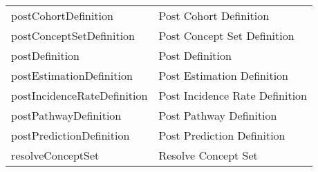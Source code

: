 \documentclass[
]{article}
\begin{document}
\begin{longtable}[]{@{}ll@{}}
\begin{minipage}[t]{0.46\columnwidth}
postCohortDefinition\strut
\end{minipage} & \begin{minipage}[t]{0.48\columnwidth}\raggedright
Post Cohort Definition\strut
\end{minipage}\tabularnewline
\begin{minipage}[t]{0.46\columnwidth}\raggedright
postConceptSetDefinition\strut
\end{minipage} & \begin{minipage}[t]{0.48\columnwidth}\raggedright
Post Concept Set Definition\strut
\end{minipage}\tabularnewline
\begin{minipage}[t]{0.46\columnwidth}\raggedright
postDefinition\strut
\end{minipage} & \begin{minipage}[t]{0.48\columnwidth}\raggedright
Post Definition\strut
\end{minipage}\tabularnewline
\begin{minipage}[t]{0.46\columnwidth}\raggedright
postEstimationDefinition\strut
\end{minipage} & \begin{minipage}[t]{0.48\columnwidth}\raggedright
Post Estimation Definition\strut
\end{minipage}\tabularnewline
\begin{minipage}[t]{0.46\columnwidth}\raggedright
postIncidenceRateDefinition\strut
\end{minipage} & \begin{minipage}[t]{0.48\columnwidth}\raggedright
Post Incidence Rate Definition\strut
\end{minipage}\tabularnewline
\begin{minipage}[t]{0.46\columnwidth}\raggedright
postPathwayDefinition\strut
\end{minipage} & \begin{minipage}[t]{0.48\columnwidth}\raggedright
Post Pathway Definition\strut
\end{minipage}\tabularnewline
\begin{minipage}[t]{0.46\columnwidth}\raggedright
postPredictionDefinition\strut
\end{minipage} & \begin{minipage}[t]{0.48\columnwidth}\raggedright
Post Prediction Definition\strut
\end{minipage}\tabularnewline
\begin{minipage}[t]{0.46\columnwidth}\raggedright
resolveConceptSet\strut
\end{minipage} & \begin{minipage}[t]{0.48\columnwidth}\raggedright
Resolve Concept Set\strut
\end{minipage}\tabularnewline
\bottomrule
\end{longtable}
\end{document}

